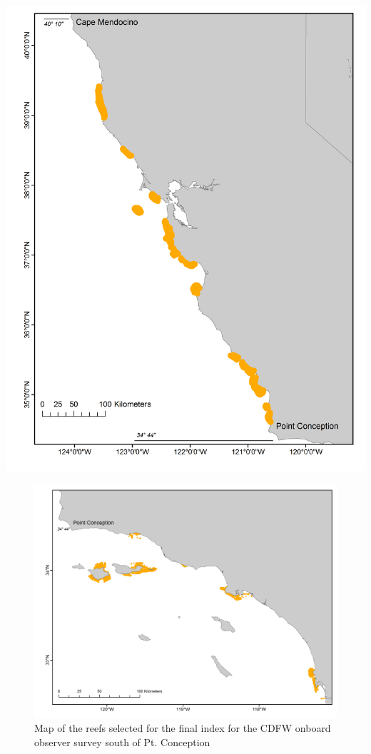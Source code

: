 \documentclass[12pt,]{article}
\begin{document}
\FloatBarrier

\includegraphics{Figures/Onboard_observer_north_sites.png} \FloatBarrier

\begin{figure}
\centering
\includegraphics{Figures/Onboard_observer_south_sites.png}
\caption{Map of the reefs selected for the final index for the CDFW
onboard observer survey south of Pt. Conception
\label{fig:Onboard_observer_south_sites}}
\end{figure}
\end{document}
